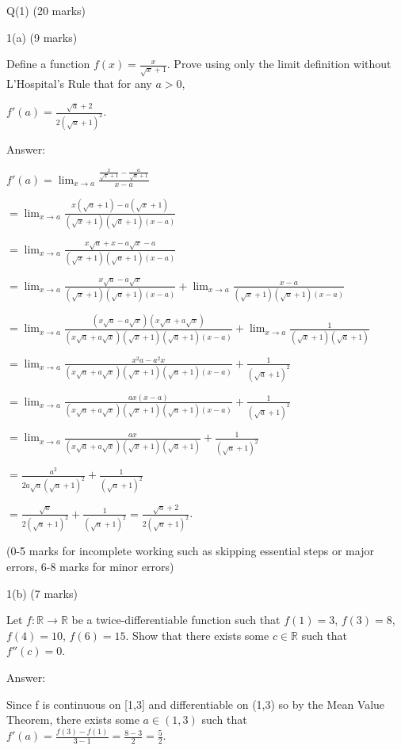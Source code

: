 \documentclass[a4paper,12pt,oneside]{book}
\theoremstyle{definition}
\begin{document}
\newpage 


Q(1) (20 marks)

1(a) (9 marks)

Define a function $f(x) = \frac{x}{\sqrt{x}+1}$. Prove using only the limit definition without L'Hospital's Rule that for any $a>0$, 

$f'(a) = \frac{\sqrt{a}+2}{2(\sqrt{a}+1)^2}$.

Answer:

$f'(a) = \lim_{x \to a} \frac{\frac{x}{\sqrt{x}+1} - \frac{a}{\sqrt{a}+1}}{x-a}$

$= \lim_{x \to a} \frac{x(\sqrt{a}+1)-a(\sqrt{x}+1)}{(\sqrt{x}+1)(\sqrt{a}+1)(x-a)}$

$= \lim_{x \to a} \frac{x\sqrt{a}+x-a\sqrt{x}-a}{(\sqrt{x}+1)(\sqrt{a}+1)(x-a)}$

$= \lim_{x \to a} \frac{x\sqrt{a}-a\sqrt{x}}{(\sqrt{x}+1)(\sqrt{a}+1)(x-a)}+\lim_{x \to a} \frac{x-a}{(\sqrt{x}+1)(\sqrt{a}+1)(x-a)}$

$= \lim_{x \to a} \frac{(x\sqrt{a}-a\sqrt{x})(x\sqrt{a}+a\sqrt{x})}{(x\sqrt{a}+a\sqrt{x})(\sqrt{x}+1)(\sqrt{a}+1)(x-a)} + \lim_{x \to a} \frac{1}{(\sqrt{x}+1)(\sqrt{a}+1)}$

$= \lim_{x \to a} \frac{x^2 a - a^2 x}{(x\sqrt{a}+a\sqrt{x})(\sqrt{x}+1)(\sqrt{a}+1)(x-a)} + \frac{1}{(\sqrt{a}+1)^2}$

$= \lim_{x \to a} \frac{ax(x-a)}{(x\sqrt{a}+a\sqrt{x})(\sqrt{x}+1)(\sqrt{a}+1)(x-a)} + \frac{1}{(\sqrt{a}+1)^2}$

$= \lim_{x \to a} \frac{ax}{(x\sqrt{a}+a\sqrt{x})(\sqrt{x}+1)(\sqrt{a}+1)} + \frac{1}{(\sqrt{a}+1)^2}$

$= \frac{a^2}{2a\sqrt{a}(\sqrt{a}+1)^2} + \frac{1}{(\sqrt{a}+1)^2}$

$= \frac{\sqrt{a}}{2(\sqrt{a}+1)^2} + \frac{1}{(\sqrt{a}+1)^2} = \frac{\sqrt{a}+2}{2(\sqrt{a}+1)^2}$.

(0-5 marks for incomplete working such as skipping essential steps or major errors, 6-8 marks for minor errors)

1(b) (7 marks)

Let $f : \mathbb{R} \rightarrow \mathbb{R}$ be a twice-differentiable function such that $f(1) = 3$, $f(3) = 8$, $f(4) = 10$, $f(6) = 15$. Show that there exists some $c \in \mathbb{R}$ such that $f''(c) = 0$.

Answer:

Since f is continuous on [1,3] and differentiable on (1,3) so by the Mean Value Theorem, there exists some $a \in (1,3)$ such that $f'(a) = \frac{f(3)-f(1)}{3-1} = \frac{8-3}{2} = \frac{5}{2}$. 
\end{document}

